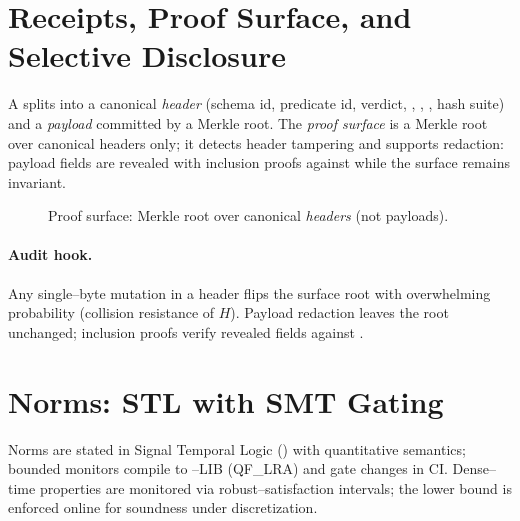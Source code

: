 \documentclass[11pt,a4paper]{article}
\numberwithin{equation}{section}
\theoremstyle{plain}
\theoremstyle{definition}
\theoremstyle{remark}
\begin{document}
\section{Receipts, Proof Surface, and Selective Disclosure}
\label{sec:receipts}
A \receipt{} splits into a canonical \emph{header} (schema id, predicate id, verdict, , , , hash suite) and a \emph{payload} committed by a Merkle root. The \emph{proof surface} is a Merkle root over canonical headers only; it detects header tampering and supports redaction: payload fields are revealed with inclusion proofs against  while the surface remains invariant.

\begin{figure}[h]
  \centering
  \caption{Proof surface: Merkle root over canonical \textit{headers} (not payloads).}
  \label{fig:surface}
\end{figure}

\paragraph{Audit hook.}
Any single--byte mutation in a header flips the surface root with overwhelming probability (collision resistance of $H$). Payload redaction leaves the root unchanged; inclusion proofs verify revealed fields against .

\section{Norms: STL with SMT Gating}
\label{sec:norms}
Norms are stated in Signal Temporal Logic (\stl) with quantitative semantics; bounded monitors compile to \smt--LIB (QF\_LRA) and gate changes in CI. Dense--time properties are monitored via robust--satisfaction intervals; the lower bound is enforced online for soundness under discretization.
\end{document}
